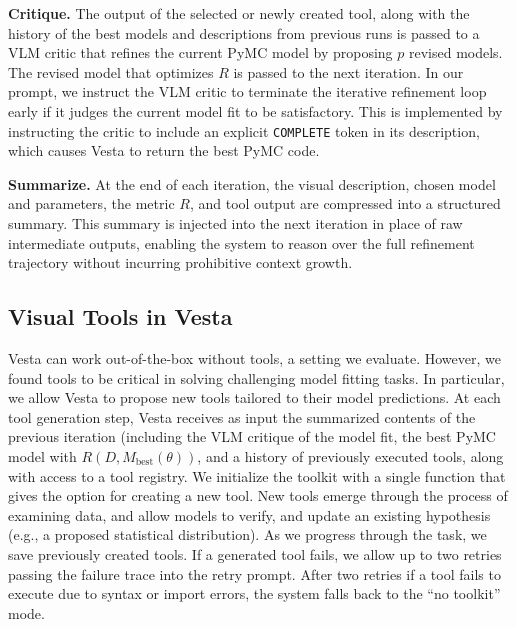\documentclass{article}
\newcommand\jl[1]{\todo[color=blue!40]{{\bf Jessy}: #1}}
\newcommand{\jessy}[1]{\textcolor{blue}{\textbf{JESSY:} #1}}
\newcommand{\method}{{\sc Vesta}}
\begin{document}
\textbf{Critique.} The output of the selected or newly created tool, along with the history of the best models and descriptions from previous runs is passed to a VLM critic that refines the current PyMC model by proposing $p$ revised models. The revised model that optimizes $R$ is passed to the next iteration. In our prompt, we instruct the VLM critic to terminate the iterative refinement 
loop early if it judges the current model fit to be satisfactory. This is implemented 
by instructing the critic to include an explicit \texttt{COMPLETE} token in its description, which causes \method{} to return the best PyMC code.

\textbf{Summarize.} At the end of each iteration, the visual description, 
chosen model and parameters, the metric $R$, and tool output are compressed into a 
structured summary. This summary is injected into the next iteration in place 
of raw intermediate outputs, enabling the system to reason over the full 
refinement trajectory without incurring prohibitive context growth.

\subsection{Visual Tools in \method{}}\label{sec:vestatools}
\vspace{-0.3em}

\method{} can work out-of-the-box without tools, a setting we evaluate. 
However, we found tools to be critical in solving challenging model fitting tasks. 
%
In particular, we allow \method{} to propose new tools tailored to their model predictions. At each tool generation step, \method{} receives as input the summarized contents of the previous iteration (including the VLM critique of the model fit, the best PyMC model with $R(D,M_{\text{best}}(\theta))$, and a history of previously executed tools, along with access to a tool registry. 
%
We initialize the toolkit with a single function that gives the option for creating a new tool. New tools emerge through the process of examining data, and allow models to verify, and update an existing hypothesis (e.g., a proposed statistical distribution).
As we progress through the task, we save previously created tools. If a generated tool fails, we allow up to two retries passing the failure trace into the retry prompt. After two retries if a tool fails to execute due to syntax or import errors, the system falls back to the ``no toolkit'' mode. 
\end{document}
